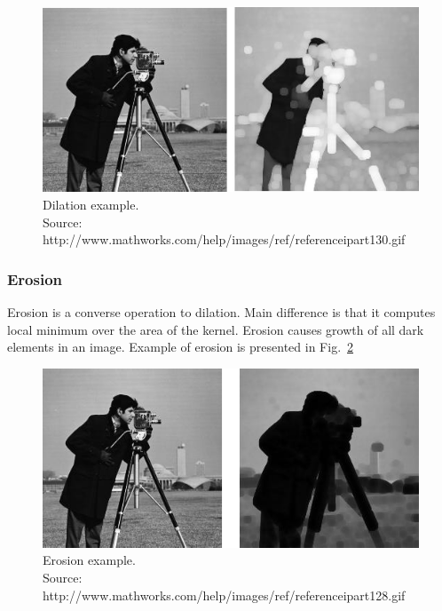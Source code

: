 \documentclass[a4paper,onecolumn,oneside,12pt]{memoir}
\begin{document}
\begin{figure}[ht]
\begin{center}
\includegraphics[scale=0.6]{images/dilationExample.jpg}
\caption{Dilation example. \\
Source: http://www.mathworks.com/help/images/ref/referenceipart130.gif}
\label{dilationExample}
\end{center}
\end{figure}

\subsubsection{Erosion}

Erosion is a converse operation to dilation. Main difference is that it computes local minimum over
the area of the kernel. Erosion causes growth of all dark elements in an image. Example of erosion
is presented in Fig.~\ref{erosionExample}

\begin{figure}[ht]
\begin{center}
\includegraphics[scale=0.6]{images/erosionExample.jpg}
\caption{Erosion example. \\
Source: http://www.mathworks.com/help/images/ref/referenceipart128.gif}
\label{erosionExample}
\end{center}
\end{figure}
\end{document}
